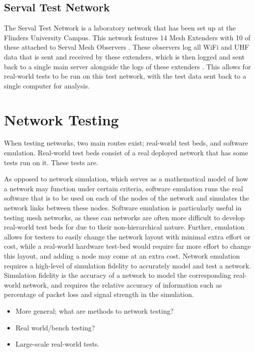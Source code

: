 \subsection{Serval Test Network}
The Serval Test Network is a laboratory network that has been set up at the Flinders University Campus.
This network features 14 Mesh Extenders with 10 of these attached to Serval Mesh Observers \parencite{wade_2019}.
These observers log all WiFi and UHF data that is sent and received by these extenders, which is then logged and sent back to a single main server alongside the logs of these extenders \parencite{lancaster_2019}.
This allows for real-world tests to be run on this test network, with the test data sent back to a single computer for analysis.


\section{Network Testing}
When testing networks, two main routes exist; real-world test beds, and software emulation.
Real-world test beds consist of a real deployed network that has some tests run on it.
These tests are.

As opposed to network simulation, which serves as a mathematical model of how a network may function under certain criteria, software emulation runs the real software that is to be used on each of the nodes of the network and simulates the network links between these nodes.
Software emulation is particularly useful in testing mesh networks, as these can networks are often more difficult to develop real-world test beds for due to their non-hierarchical nature.
Further, emulation allows for testers to easily change the network layout with minimal extra effort or cost, while a real-world hardware test-bed would require far more effort to change this layout, and adding a node may come at an extra cost.
Network emulation requires a high-level of simulation fidelity to accurately model and test a network.
Simulation fidelity is the accuracy of a network to model the corresponding real-world network, and requires the relative accuracy of information such as percentage of packet loss and signal strength in the simulation. 

\begin{itemize}
    \item More general; what are methods to network testing?
    \item Real world/bench testing?
    \item Large-scale real-world tests.
\end{itemize}

